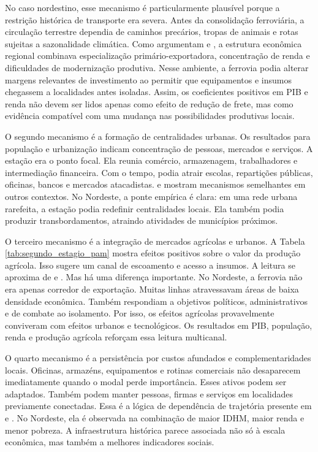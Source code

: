 \documentclass[12pt,a4paper]{article}
\begin{document}
No caso nordestino, esse mecanismo é particularmente plausível porque a restrição histórica de transporte era severa. Antes da consolidação ferroviária, a circulação terrestre dependia de caminhos precários, tropas de animais e rotas sujeitas a sazonalidade climática. Como argumentam \citet{furtado1959} e \citet{eisenberg1974}, a estrutura econômica regional combinava especialização primário-exportadora, concentração de renda e dificuldades de modernização produtiva. Nesse ambiente, a ferrovia podia alterar margens relevantes de investimento ao permitir que equipamentos e insumos chegassem a localidades antes isoladas. Assim, os coeficientes positivos em PIB e renda não devem ser lidos apenas como efeito de redução de frete, mas como evidência compatível com uma mudança nas possibilidades produtivas locais.

O segundo mecanismo é a formação de centralidades urbanas. Os resultados para população e urbanização indicam concentração de pessoas, mercados e serviços. A estação era o ponto focal. Ela reunia comércio, armazenagem, trabalhadores e intermediação financeira. Com o tempo, podia atrair escolas, repartições públicas, oficinas, bancos e mercados atacadistas. \citet{berger2017} e \citet{jedwab2016} mostram mecanismos semelhantes em outros contextos. No Nordeste, a ponte empírica é clara: em uma rede urbana rarefeita, a estação podia redefinir centralidades locais. Ela também podia produzir transbordamentos, atraindo atividades de municípios próximos.

O terceiro mecanismo é a integração de mercados agrícolas e urbanos. A Tabela \ref{tab:segundo_estagio_pam} mostra efeitos positivos sobre o valor da produção agrícola. Isso sugere um canal de escoamento e acesso a insumos. A leitura se aproxima de \citet{fogel1964} e \citet{summerhill2005}. Mas há uma diferença importante. No Nordeste, a ferrovia não era apenas corredor de exportação. Muitas linhas atravessavam áreas de baixa densidade econômica. Também respondiam a objetivos políticos, administrativos e de combate ao isolamento. Por isso, os efeitos agrícolas provavelmente conviveram com efeitos urbanos e tecnológicos. Os resultados em PIB, população, renda e produção agrícola reforçam essa leitura multicanal.

O quarto mecanismo é a persistência por custos afundados e complementaridades locais. Oficinas, armazéns, equipamentos e rotinas comerciais não desaparecem imediatamente quando o modal perde importância. Esses ativos podem ser adaptados. Também podem manter pessoas, firmas e serviços em localidades previamente conectadas. Essa é a lógica de dependência de trajetória presente em \citet{donaldsonhornbeck2016} e \citet{donaldson2018}. No Nordeste, ela é observada na combinação de maior IDHM, maior renda e menor pobreza. A infraestrutura histórica parece associada não só à escala econômica, mas também a melhores indicadores sociais.
\end{document}
